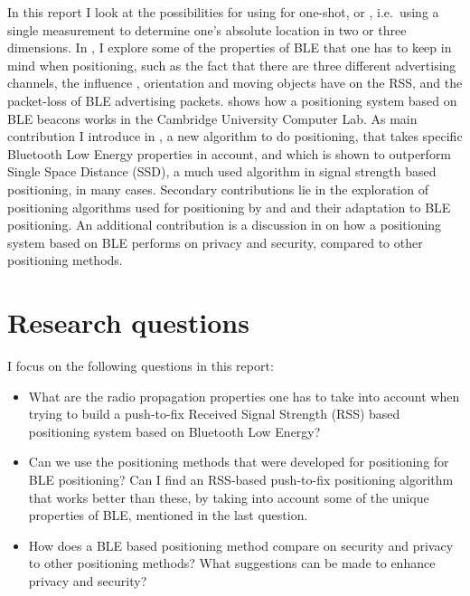 In this report I look at the possibilities for using \BLE for one-shot, or \ptfp, i.e.\ using a single measurement to determine one's absolute location in two or three dimensions.
In , I explore some of the properties of BLE that one has to keep in mind when positioning, such as the fact that there are three different advertising channels, the influence \mpi, orientation and moving objects have on the RSS, and the packet-loss of BLE advertising packets.
 shows how a positioning system based on BLE beacons works in the Cambridge University Computer Lab.
As main contribution I introduce  in , a new algorithm to do positioning, that takes specific Bluetooth Low Energy properties in account, and which is shown to outperform Single Space Distance (SSD), a much used algorithm in signal strength based positioning, in many cases.
Secondary contributions lie in the exploration of positioning algorithms used for \wifi positioning by \citep{bahl2000radar} and \citep{king2006compass} and their adaptation to BLE positioning.
An additional contribution is a discussion in  on how a positioning system based on BLE performs on privacy and security, compared to other positioning methods.

\section{Research questions}
I focus on the following questions in this report:
\begin{itemize}
    \item What are the radio propagation properties one has to take into account when trying to build a push-to-fix Received Signal Strength (RSS) based positioning system based on Bluetooth Low Energy?
    \item Can we use the positioning methods that were developed for \wifi positioning for BLE positioning? Can I find an RSS-based push-to-fix positioning algorithm that works better than these, by taking into account some of the unique properties of BLE, mentioned in the last question.
    \item How does a BLE based positioning method compare on security and privacy to other positioning methods? What suggestions can be made to enhance privacy and security?
\end{itemize}
